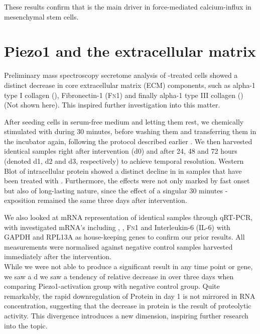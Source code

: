 These results confirm that \Piezo{} is the main driver in force-mediated calcium-influx in mesenchymal stem cells.


\section{Piezo1 and the extracellular matrix}

Preliminary mass spectroscopy secretome analysis of \Yoda-treated cells showed a distinct decrease in core extracellular matrix (ECM) components, such as alpha-1 type I collagen (\colone), Fibronectin-1 (\textsc{Fn1}) and finally alpha-1 type III collagen (\colthree) (Not shown here).
This inspired further investigation into this matter.\par

After seeding cells in serum-free medium and letting them rest, we chemically stimulated \Piezo{} with \Yoda{} during 30 minutes, before washing them and transferring them in the incubator again, following the protocol described earlier . We then harvested identical samples right after intervention (d0) and after 24, 48 and 72 hours (denoted d1, d2 and d3, respectively) to achieve temporal resolution. Western Blot of intracellular protein showed a distinct decline in \colone in samples that have been treated with \Yoda{}.  Furthermore, the effects were not only marked by fast onset but also of long-lasting nature, since the effect of a singular 30 minutes \Yoda{}-exposition remained the same three days after intervention.\par
We also looked at mRNA representation of identical samples through qRT-PCR, with investigated mRNA's including \colone{}, \colthree{}, \textsc{Fn}1 and Interleukin-6 (IL-6) with GAPDH and RPL13A as house-keeping genes to confirm our prior results.  All measurements were normalised against negative control samples harvested immediately after the intervention.\\
While we were not able to produce a significant result in any time point or gene, we saw a d
we saw a tendency of relative decrease in \colone{} over three days when comparing Piezo1-activation group with negative control group. Quite remarkably, the rapid downregulation of Protein in day 1 is not mirrored in RNA concentration, suggesting that the decrease in protein is the result of proteolytic activity. This divergence introduces a new dimension, inspiring further research into the topic.

